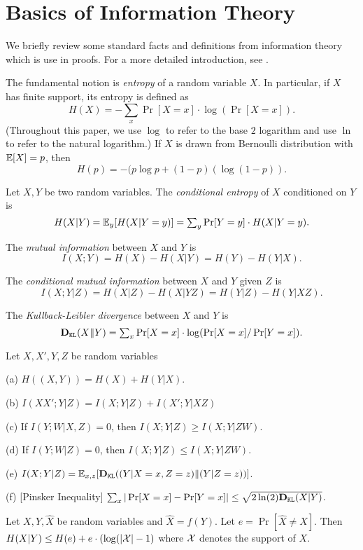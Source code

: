 \section{Basics of Information Theory}

We briefly review some standard facts and definitions from information theory which is use in proofs. For a more detailed introduction, see \cite{CK11}. 

The fundamental notion is \emph{entropy} of a random variable $X$. In particular, if $X$ has finite support, its entropy is defined as 
\[ H(X) = \textstyle - \sum_{x} \Pr[X = x]\cdot  \log(\Pr[X = x]). \]
(Throughout this paper, we use $\log$ to refer to the base $2$ logarithm and use $\ln$ to refer to the natural logarithm.) If $X$ is drawn from Bernoulli distribution with $\mathbb{E}[X]=p$, then 
    \[ H(p) = -(p\log p + (1-p)(\log(1-p)). \]

Let $X,Y$ be two random variables. The \emph{conditional entropy} of $X$ conditioned on $Y$ is 
\[ H(X|Y) 
    = \mathbb{E}_y[H(X|Y = y)] 
    = \textstyle \sum_{y} \Pr[Y=y]\cdot H(X|Y = y). \]

The \emph{mutual information} between $X$ and $Y$ is 
\[ I(X;Y) = H(X) - H(X|Y) = H(Y) - H(Y|X).\]

The \emph{conditional mutual information} between $X$ and $Y$ given $Z$ is  
\[ I(X;Y|Z) = H(X|Z) - H(X|YZ) = H(Y|Z) - H(Y|XZ).\]


The \emph{Kullback-Leibler divergence} between $X$ and $Y$ is 
\[ \textbf{D}_{\mathtt{KL}}(X\| Y)\textstyle  = \sum_x \Pr[X = x] \cdot \log(\Pr[X = x] / \Pr[Y = x]).\]


\begin{lemma}
Let $X,X',Y,Z$ be random variables 
\begin{OneLiners}
\item[(a)] $H((X,Y)) = H(X) + H(Y|X)$.
\item[(b)] $I(X X';Y|Z) = I(X;Y|Z) + I(X';Y|XZ)$
\item[(c)] If $I(Y;W|X,Z) = 0$, then $I(X;Y|Z) \geq I(X;Y|ZW)$.
\item[(d)] If $I(Y;W|Z) = 0$, then $I(X;Y|Z) \leq I(X;Y|ZW)$.
\item[(e)] $I(X;Y|Z) = \mathbb{E}_{x,z}[\textbf{D}_{\mathtt{KL}}((Y|X = x, Z=z)\|(Y|Z=z))]$.
\item[(f)] [Pinsker Inequality] $\sum_x | \Pr[X=x] - \Pr[Y=x]| \leq \sqrt{2 \ln(2) \textbf{D}_{\mathtt{KL}}(X|Y)}$.
\end{OneLiners}
\end{lemma}

\begin{lemma}
Let $X,Y,\hat{X}$ be random variables and $\hat{X} = f(Y)$. Let $e = \Pr[\hat{X} \neq X]$. Then $H(X|Y) \leq H(e) + e \cdot (\log(|\mathcal{X}|-1)$ where $\mathcal{X}$ denotes the support of $X$.
\end{lemma} 
